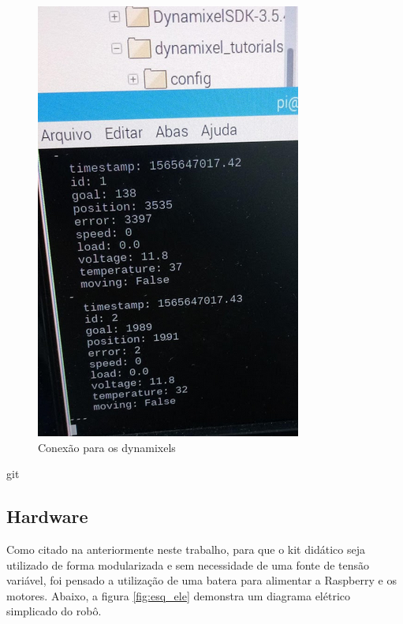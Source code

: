 \begin{figure}[H]
	\centering
	\includegraphics[scale=0.8, angle=0]{Figures/terminal_dyna.png}
	\caption{Conexão para os dynamixels}
	\label{fig:term_dyna}
\end{figure}

git
\subsection{Hardware}
Como citado na anteriormente neste trabalho, para que o kit didático seja utilizado de forma modularizada e sem necessidade de uma fonte de tensão variável, foi pensado a utilização de uma batera para alimentar a Raspberry e os motores. Abaixo, a figura \ref{fig:esq_ele} demonstra um diagrama elétrico simplicado do robô.


